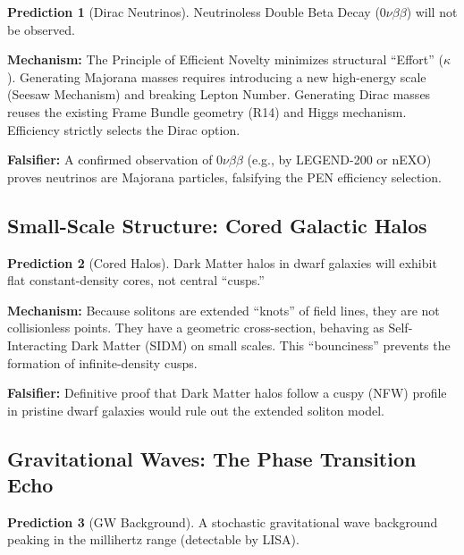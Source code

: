 \documentclass[11pt,a4paper]{article}
\theoremstyle{definition}
\newtheorem{prediction}{Prediction}
\theoremstyle{plain}
\theoremstyle{remark}
\newcommand{\effort}{\kappa}
\begin{document}
\begin{prediction}[Dirac Neutrinos]
Neutrinoless Double Beta Decay ($0\nu\beta\beta$) will not be observed.
\end{prediction}

\textbf{Mechanism:} The Principle of Efficient Novelty minimizes structural ``Effort'' ($\effort$). Generating Majorana masses requires introducing a new high-energy scale (Seesaw Mechanism) and breaking Lepton Number. Generating Dirac masses reuses the existing Frame Bundle geometry (R14) and Higgs mechanism. Efficiency strictly selects the Dirac option.

\textbf{Falsifier:} A confirmed observation of $0\nu\beta\beta$ (e.g., by LEGEND-200 or nEXO) proves neutrinos are Majorana particles, falsifying the PEN efficiency selection.

\subsection{Small-Scale Structure: Cored Galactic Halos}

\begin{prediction}[Cored Halos]
Dark Matter halos in dwarf galaxies will exhibit flat constant-density cores, not central ``cusps.''
\end{prediction}

\textbf{Mechanism:} Because solitons are extended ``knots'' of field lines, they are not collisionless points. They have a geometric cross-section, behaving as Self-Interacting Dark Matter (SIDM) on small scales. This ``bounciness'' prevents the formation of infinite-density cusps.

\textbf{Falsifier:} Definitive proof that Dark Matter halos follow a cuspy (NFW) profile in pristine dwarf galaxies would rule out the extended soliton model.

\subsection{Gravitational Waves: The Phase Transition Echo}

\begin{prediction}[GW Background]
A stochastic gravitational wave background peaking in the millihertz range (detectable by LISA).
\end{prediction}
\end{document}
